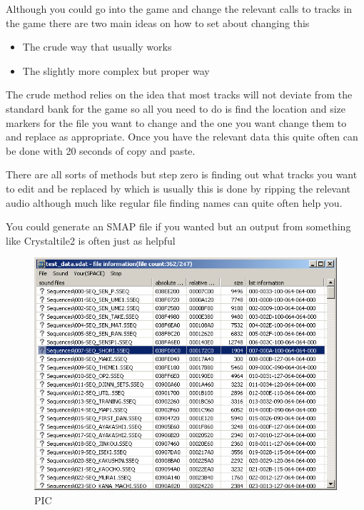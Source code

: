 \documentclass[
]{book}
\providecommand{\tightlist}{%
  \setlength{\itemsep}{0pt}\setlength{\parskip}{0pt}}
\begin{document}
Although you could go into the game and change the relevant calls to tracks in the game there are two main ideas on how to set about changing this

\begin{itemize}
\tightlist
\item
  The crude way that usually works
\item
  The slightly more complex but proper way
\end{itemize}

The crude method relies on the idea that most tracks will not deviate from the standard bank for the game so all you need to do is find the location and size markers for the file you want to change and the one you want change them to and replace as appropriate. Once you have the relevant data this quite often can be done with 20 seconds of copy and paste.

There are all sorts of methods but step zero is finding out what tracks you want to edit and be replaced by which is usually this is done by ripping the relevant audio although much like regular file finding names can quite often help you.

You could generate an SMAP file if you wanted but an output from something like Crystaltile2 is often just as helpful

\begin{figure}
\centering
\includegraphics{images/139_home_fast6191_romhackingguide_unrenamed_fil___original_borders_crystaltile2sdatrelinking1.png}
\caption{PIC}
\end{figure}
\end{document}
